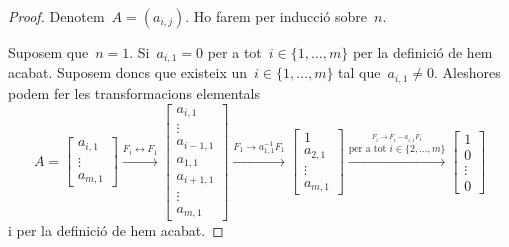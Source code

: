 \documentclass[../../main.tex]{subfiles}
\begin{document}
    \begin{proof} %
        Denotem~\(A=(a_{i,j})\).
        Ho farem per inducció sobre~\(n\).

        Suposem que~\(n=1\).
        Si~\(a_{i,1}=0\) per a tot~\(i\in\{1,\dots,m\}\) per la definició de  hem acabat.
        Suposem doncs que existeix un~\(i\in\{1,\dots,m\}\) tal que~\(a_{i,1}\neq0\).
        Aleshores podem fer les transformacions elementals
        \[A=
        \left[\begin{matrix}
        a_{i,1}\\
        \vdots\\
        a_{m,1}
        \end{matrix}\right]
        \overset{F_{i}\leftrightarrow F_{1}}{\longrightarrow}
        \left[\begin{matrix}
        a_{i,1}\\
        \vdots\\
        a_{i-1,1}\\
        a_{1,1}\\
        a_{i+1,1}\\
        \vdots\\
        a_{m,1}
        \end{matrix}\right]
        \overset{F_{1}\rightarrow a_{1,1}^{-1}F_{1}}{\longrightarrow}
        \left[\begin{matrix}
        1\\
        a_{2,1}\\
        \vdots\\
        a_{m,1}
        \end{matrix}\right]
        \overset{\overset{F_{i}\rightarrow F_{i}-a_{i,1}F_{1}}{\text{per a tot }i\in\{2,\dots,m\}}}{\longrightarrow}
        \left[\begin{matrix}
        1\\
        0\\
        \vdots\\
        0
        \end{matrix}\right]\]
        i per la definició de  hem acabat.


\end{proof}
\end{document}
